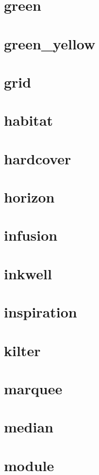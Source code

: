 \section{green}
\newpage
\section{green\_yellow}
\newpage
\section{grid}
\newpage
\section{habitat}
\newpage
\section{hardcover}
\newpage
\section{horizon}
\newpage
\section{infusion}
\newpage
\section{inkwell}
\newpage
\section{inspiration}
\newpage
\section{kilter}
\newpage
\section{marquee}
\newpage
\section{median}
\newpage
\section{module}
\newpage
